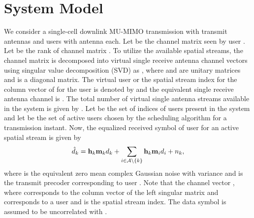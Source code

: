 \documentclass[conference,letterpaper]{./../../IEEE/IEEEtran}
\begin{document}
\section{System Model}
\label{sec:system_model}
We consider a single-cell downlink MU-MIMO transmission with  transmit antennas and  users with  antenna each. Let  be the channel matrix seen by user . Let  be the rank of channel matrix . To utilize the available spatial streams, the channel matrix  is decomposed into  virtual single receive antenna channel vectors using singular value decomposition (SVD) as , where  and  are unitary matrices and  is a diagonal matrix. The virtual user or the spatial stream index for the  column vector of  for the  user is denoted by  and the equivalent single receive antenna channel is . The total number of virtual single antenna streams available in the system is given by . Let  be the set of indices of users present in the system and let  be the set of active users chosen by the scheduling algorithm for a transmission instant. Now, the equalized received symbol  of user  for an active spatial stream is given by
\begin{equation}
	\hat{d}_k = \mathbf{h}_{k} \mathbf{m}_{k} d_k + \sum_{i \in \mathcal{A} \backslash \{k\}} \mathbf{h}_{k} \mathbf{m}_{i} d_i + {n}_{k},
\end{equation}
where  is the equivalent zero mean complex Gaussian noise with variance  and  is the transmit precoder corresponding to user . Note that the channel vector , where  corresponds to the  column vector of the left singular matrix  and  corresponds to a user and  is the spatial stream index. The data symbol  is assumed to be uncorrelated with .
\end{document}
